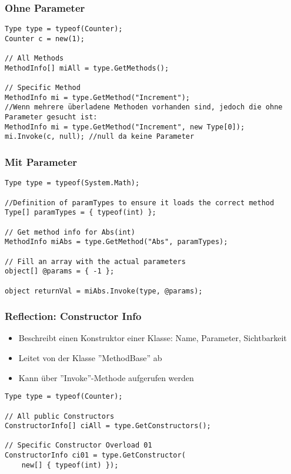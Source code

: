 \begin{multicols*}{2}
\subsubsection{Ohne Parameter}
\begin{lstlisting}
Type type = typeof(Counter); 
Counter c = new(1);

// All Methods
MethodInfo[] miAll = type.GetMethods();

// Specific Method
MethodInfo mi = type.GetMethod("Increment");
//Wenn mehrere überladene Methoden vorhanden sind, jedoch die ohne Parameter gesucht ist:
MethodInfo mi = type.GetMethod("Increment", new Type[0]);
mi.Invoke(c, null); //null da keine Parameter
\end{lstlisting}
\subsubsection{Mit Parameter}
\begin{lstlisting}
Type type = typeof(System.Math); 

//Definition of paramTypes to ensure it loads the correct method
Type[] paramTypes = { typeof(int) };

// Get method info for Abs(int)
MethodInfo miAbs = type.GetMethod("Abs", paramTypes);

// Fill an array with the actual parameters
object[] @params = { -1 };

object returnVal = miAbs.Invoke(type, @params);
\end{lstlisting}

\subsubsection{Reflection: Constructor Info}
\begin{itemize}
    \item Beschreibt einen Konstruktor einer Klasse: Name, Parameter, Sichtbarkeit
    \item Leitet von der Klasse ''MethodBase'' ab
    \item Kann über ''Invoke''-Methode aufgerufen werden
\end{itemize}
\begin{lstlisting}
Type type = typeof(Counter); 

// All public Constructors
ConstructorInfo[] ciAll = type.GetConstructors();

// Specific Constructor Overload 01
ConstructorInfo ci01 = type.GetConstructor(
    new[] { typeof(int) });


\end{lstlisting}
\end{multicols*}
